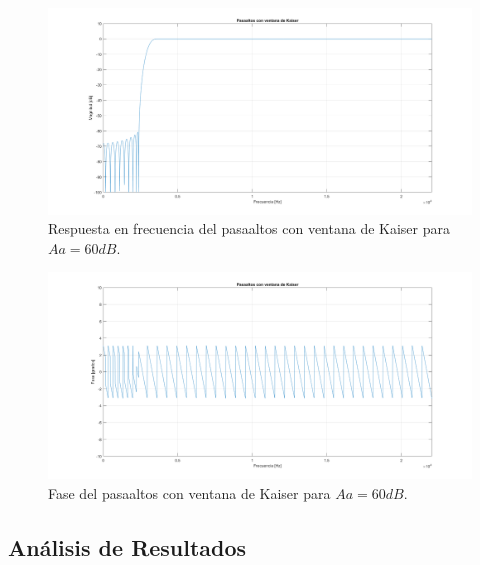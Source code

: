 \begin{figure}[H]
  \includegraphics[scale=.35]{./images/1/kaimoduloAa60.png}
  \caption{Respuesta en frecuencia del pasaaltos con ventana de Kaiser para $Aa=60dB$.}
\end{figure}
\begin{figure}[H]
  \includegraphics[scale=.35]{./images/1/kaifaseAa60.png}
  \caption{Fase del pasaaltos con ventana de Kaiser para $Aa=60dB$.}
\end{figure}


\subsection{Análisis de Resultados}

